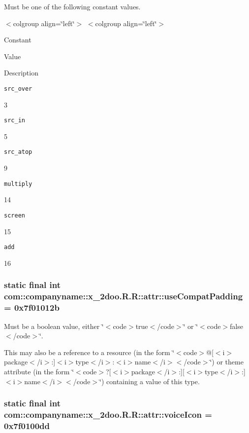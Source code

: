 Must be one of the following constant values. \begin{TabularC}{0}
\hline
\end{TabularC}
$<$colgroup align=\char`\"{}left\char`\"{}$>$ $<$colgroup align=\char`\"{}left\char`\"{}$>$ 

Constant

Value

Description 

{\tt src\_\-over}

3

{\tt src\_\-in}

5

{\tt src\_\-atop}

9

{\tt multiply}

14

{\tt screen}

15

{\tt add}

16\hypertarget{classcom_1_1companyname_1_1x__2doo_1_1_r_1_1attr_5766848d838192d625703690cc6213fc}{
\subsubsection[{useCompatPadding}]{\setlength{\rightskip}{0pt plus 5cm}static final int com::companyname::x\_\-2doo.R.R::attr::useCompatPadding = 0x7f01012b}}
\label{classcom_1_1companyname_1_1x__2doo_1_1_r_1_1attr_5766848d838192d625703690cc6213fc}


Must be a boolean value, either \char`\"{}$<$code$>$true$<$/code$>$\char`\"{} or \char`\"{}$<$code$>$false$<$/code$>$\char`\"{}. 

This may also be a reference to a resource (in the form \char`\"{}$<$code$>$@\mbox{[}$<$i$>$package$<$/i$>$:\mbox{]}$<$i$>$type$<$/i$>$:$<$i$>$name$<$/i$>$$<$/code$>$\char`\"{}) or theme attribute (in the form \char`\"{}$<$code$>$?\mbox{[}$<$i$>$package$<$/i$>$:\mbox{]}\mbox{[}$<$i$>$type$<$/i$>$:\mbox{]}$<$i$>$name$<$/i$>$$<$/code$>$\char`\"{}) containing a value of this type. \hypertarget{classcom_1_1companyname_1_1x__2doo_1_1_r_1_1attr_ee7d698d776fc746f308cf5eba381f11}{
\subsubsection[{voiceIcon}]{\setlength{\rightskip}{0pt plus 5cm}static final int com::companyname::x\_\-2doo.R.R::attr::voiceIcon = 0x7f0100dd}}
\label{classcom_1_1companyname_1_1x__2doo_1_1_r_1_1attr_ee7d698d776fc746f308cf5eba381f11}


